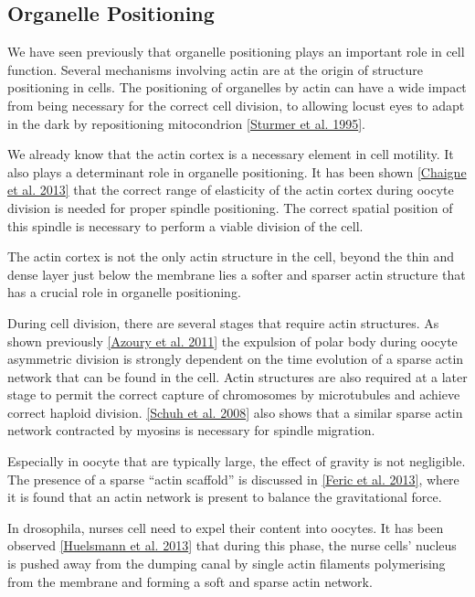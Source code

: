 \documentclass[A4paperpaper,11pt,english]{sphinxmanual}
\begin{document}
\subsection{Organelle Positioning}
\label{index-latex:organelle-positioning}\label{index-latex:id41}
We have seen previously that organelle positioning plays an important role in
cell function.  Several mechanisms involving actin are at the origin of
structure positioning in cells. The positioning of organelles by actin can have
a wide impact from being necessary for the correct cell division, to
allowing locust eyes to adapt in the dark by repositioning mitocondrion
{\hyperref[index-latex:sturmer1995]{{[}Sturmer et al. 1995{]}}}.

We already know that the actin cortex is a necessary element in cell
motility. It also plays a determinant  role in organelle
positioning. It has been shown  {\hyperref[index-latex:chaigne2013a]{{[}Chaigne et al. 2013{]}}} that the correct range
of elasticity of the actin cortex during oocyte division is needed for proper spindle
positioning. The correct spatial position of this spindle is necessary to
perform a viable division of the cell.

The actin cortex is not the only actin structure in the cell, beyond the thin and
dense layer just below the membrane lies a softer and sparser actin structure that has a
crucial role in organelle positioning.

During cell division, there are several stages that require actin structures.
As shown previously {\hyperref[index-latex:azoury2011]{{[}Azoury et al. 2011{]}}} the expulsion of polar body during
oocyte asymmetric division is  strongly dependent on the time evolution of a
sparse actin network that can be found in the cell. Actin structures are  also
required at a later stage to permit the correct capture of chromosomes by
microtubules and achieve correct haploid division.  {\hyperref[index-latex:schuh2008]{{[}Schuh et al. 2008{]}}} also shows
that a similar sparse actin network contracted by myosins is necessary for
spindle migration.

Especially in oocyte that are typically large, the effect of gravity is not
negligible. The presence of a sparse ``actin scaffold'' is discussed in
{\hyperref[index-latex:feric2013]{{[}Feric et al. 2013{]}}}, where it is found that an actin network is present to
balance the gravitational force.

In drosophila, nurses cell need to expel their content into oocytes. It has been
observed {\hyperref[index-latex:huelsmann2013]{{[}Huelsmann et al. 2013{]}}} that during this phase, the nurse cells' nucleus
is pushed away from the dumping canal by single actin filaments polymerising
from the membrane and forming a soft and sparse actin network.
\end{document}
